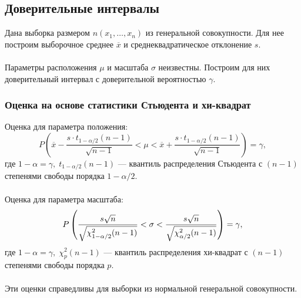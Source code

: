 \documentclass[12pt]{article}
\begin{document}
\subsection{Доверительные интервалы}
Дана выборка размером $n (x_1,\dots,x_n)$ из генеральной совокупности. Для нее построим выборочное среднее $\overline{x}$ и среднеквадратическое отклонение $s$.\\
\phantom{0}\\
Параметры расположения $\mu$ и масштаба $\sigma$ неизвестны. Построим для них доверительный интервал с доверительной вероятностью $\gamma$.

\subsubsection{Оценка на основе статистики Стьюдента и хи-квадрат}
Оценка для параметра положения:
\begin{equation}
    P\left(\overline{x}-\frac{s\cdot t_{1-\alpha/2}(n-1)}{\sqrt{n-1}} < \mu < \overline{x}+\frac{s\cdot t_{1-\alpha/2}(n-1)}{\sqrt{n-1}}\right) = \gamma,
    \label{mStud}
\end{equation}
где $1 - \alpha = \gamma, \; t_{1-\alpha/2}(n-1)$ --- квантиль распределения Стьюдента с $(n-1)$ степенями свободы порядка $1 - \alpha/2$.\\
\phantom{0}\\
Оценка для параметра масштаба:
\begin{equation}
    P\left(\frac{s\sqrt{n}}{\sqrt{\mathstrut \chi^2_{1 - \alpha/2}(n-1)}} < \sigma < \frac{s\sqrt{n}}{\sqrt{\mathstrut \chi^2_{\alpha/2}(n-1)}}\right) = \gamma,
    \label{sStud}
\end{equation}
где $1 - \alpha = \gamma, \; \chi^2_{p}(n-1)$ --- квантиль распределения хи-квадрат с $(n-1)$ степенями свободы порядка $p$.\\
\phantom{0}\\
Эти оценки справедливы для выборки из нормальной генеральной совокупности.
\end{document}
